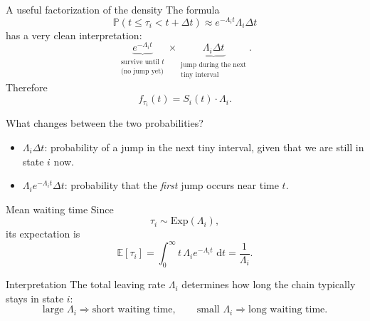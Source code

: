 \documentclass[aspectratio=169,professionalfonts]{beamer}
\newcommand{\Prob}{\mathbb{P}}
\newcommand{\E}{\mathbb{E}}
\newcommand{\dd}{\,\mathrm{d}}
\begin{document}
\begin{frame}{A useful factorization of the density}
\small
The formula
\[
\Prob(t\le \tau_i<t+\Delta t)\approx e^{-\Lambda_i t}\Lambda_i\Delta t
\]
has a very clean interpretation:
\[
\underbrace{e^{-\Lambda_i t}}_{\substack{\text{survive until }t\\\text{(no jump yet)}}}
\times
\underbrace{\Lambda_i\Delta t}_{\substack{\text{jump during the next}\\\text{tiny interval}}}.
\]
Therefore
\[
f_{\tau_i}(t)=S_i(t)\cdot \Lambda_i.
\]

\begin{block}{What changes between the two probabilities?}
\begin{itemize}
  \item $\Lambda_i\Delta t$: probability of a jump in the next tiny interval, given that we are still in state $i$ now.
  \item $\Lambda_i e^{-\Lambda_i t}\Delta t$: probability that the \emph{first} jump occurs near time $t$.
\end{itemize}
\end{block}
\end{frame}

\begin{frame}{Mean waiting time}
\small
Since
\[
\tau_i\sim \mathrm{Exp}(\Lambda_i),
\]
its expectation is
\[
\E[\tau_i]
=\int_0^\infty t\,\Lambda_i e^{-\Lambda_i t}\,\dd t
=\frac{1}{\Lambda_i}.
\]

\begin{block}{Interpretation}
The total leaving rate $\Lambda_i$ determines how long the chain typically stays in state $i$:
\[
\text{large }\Lambda_i \Longrightarrow \text{short waiting time},\qquad
\text{small }\Lambda_i \Longrightarrow \text{long waiting time}.
\]
\end{block}
\end{frame}
\end{document}
